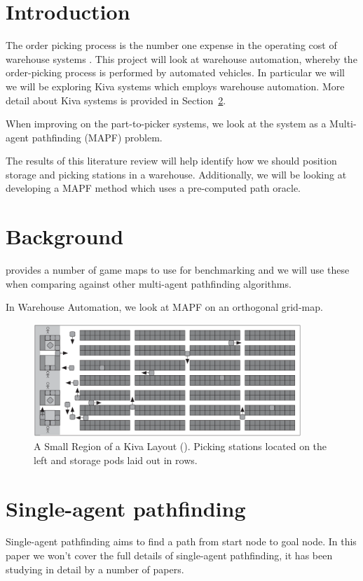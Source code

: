 \documentclass[a4paper,11pt]{article}
\begin{document}
\section{Introduction}
The order picking process is the number one expense in the operating cost of warehouse systems \cite{de2007design}. This project will look at warehouse automation, whereby the order-picking process is performed by automated vehicles. In particular we will we will be exploring Kiva systems which employs warehouse automation. More detail about Kiva systems is provided in Section~\ref{sec:background}.

When improving on the part-to-picker systems, we look at the system as a Multi-agent pathfinding (MAPF) problem. 



The results of this literature review will help identify how we should position storage and picking stations in a warehouse. Additionally, we will be looking at developing a MAPF method which uses a pre-computed path oracle.


\section{Background} \label{sec:background}

\cite{sturtevant2012benchmarks} provides a number of game maps to use for benchmarking and we will use these when comparing against other multi-agent pathfinding algorithms.

In Warehouse Automation, we look at MAPF on an orthogonal grid-map.

\begin{figure}[h]
	\centering
	\includegraphics[width=0.9\textwidth]{graphics/kivasystemlayout}
	\caption{A Small Region of a Kiva Layout (\cite{wurman2008coordinating}). Picking stations located on the left and storage pods laid out in rows.}
	\label{kivalayout1}
\end{figure}

\section{Single-agent pathfinding}
Single-agent pathfinding aims to find a path from start node to goal node. In this paper we won't cover the full details of single-agent pathfinding, it has been studying in detail by a number of papers.
\end{document}

